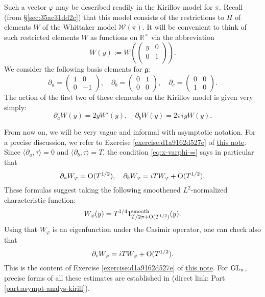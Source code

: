 \documentclass[reqno]{amsart} 
\numberwithin{equation}{section}
\numberwithin{theorem}{section}
\begin{document}
Such a vector $\varphi$ may be described readily in the Kirillov model for $\pi$.  Recall (from \S\ref{sec:35ac31dd2c}) that this model consists of the restrictions to $H$ of elements $W$ of the Whittaker model $\mathcal{W}(\pi)$.  It will be convenient to think of such restricted elements $W$ as functions on $\mathbb{R}^\times$ via the abbreviation
\begin{equation*}
W(y) := W\left(
  \begin{pmatrix}
y & 0 \\
0 & 1 \\
\end{pmatrix} \right).
\end{equation*}
We consider the following basis elements for $\mathfrak{g}$:
\begin{equation*}
  \partial_a =
  \begin{pmatrix}
    1 & 0 \\
    0 & -1
  \end{pmatrix},
  \quad
  \partial_b =
  \begin{pmatrix}
    0 & 1 \\
    0 & 0
  \end{pmatrix},
  \quad
  \partial_c =
  \begin{pmatrix}
    0 & 0 \\
    1 & 0
  \end{pmatrix}  .
\end{equation*}
The action of the first two of these elements on the Kirillov model is given very simply:
\begin{equation*}
  \partial_a W(y) = 2 y W'(y),
  \quad
  \partial_b W(y) = 2 \pi i y W(y).
\end{equation*}

From now on, we will be very vague and informal with asymptotic notation.  For a precise discussion, we refer to Exercise \ref{exercise:d1a9162d527e} of \href{20230524T094424__exercises-localized-vectors.tex.pdf}{this note}.  Since $\langle \partial_a, \tau \rangle = 0$ and $\langle \partial_b, \tau \rangle = T$, the condition \eqref{eq:x-varphi-=} says in particular that
\begin{equation*}
  \partial_a W_\varphi = \operatorname{O}(T^{1/2}),
  \quad
  \partial_b W_\varphi = i T W_\varphi + \operatorname{O}(T^{1/2}).
\end{equation*}
These formulas suggest taking the following smoothened $L^2$-normalized characteristic function:
\begin{equation}\label{eqn:35ac3e31cb}
  W_\varphi(y) = T^{1/4} 1_{T / 2 \pi + \operatorname{O}(T^{1/2})}^{\text{smooth}}(y).
\end{equation}
Using that $W_\varphi$ is an eigenfunction under the Casimir operator, one can check also that
\begin{equation*}
  \partial_c W_\varphi = i T W_\varphi + \operatorname{O}(T^{1/2}).
\end{equation*}
This is the content of Exercise \ref{exercise:d1a9162d527e} of \href{20230524T094424__exercises-localized-vectors.tex.pdf}{this note}.  For $\operatorname{GL}_n$,  precise forms of all these estimates are established in \cite[Part 3]{2021arXiv210915230N} (direct link: Part \ref{part:asympt-analys-kirill}).
\end{document}
